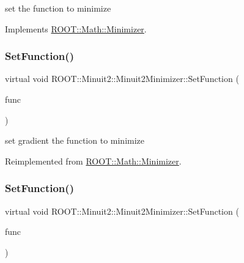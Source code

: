 set the function to minimize 



Implements \mbox{\hyperlink{classROOT_1_1Math_1_1Minimizer_a4391c613ab0c3f9777e56b487ffa5eac}{R\+O\+O\+T\+::\+Math\+::\+Minimizer}}.

\mbox{\label{classROOT_1_1Minuit2_1_1Minuit2Minimizer_aeb98c40cf3486fe8fb9bec4da0f7942e}} 
\subsubsection{\texorpdfstring{SetFunction()}{SetFunction()}\hspace{0.1cm}{\footnotesize\ttfamily [3/4]}}
{\footnotesize\ttfamily virtual void R\+O\+O\+T\+::\+Minuit2\+::\+Minuit2\+Minimizer\+::\+Set\+Function (\begin{DoxyParamCaption}\item[{const \mbox{\hyperlink{namespaceROOT_1_1Math_a014e019aaf9304a00e9231bd9ed232fb}{R\+O\+O\+T\+::\+Math\+::\+I\+Multi\+Grad\+Function}} \&}]{func }\end{DoxyParamCaption})\hspace{0.3cm}{\ttfamily [virtual]}}



set gradient the function to minimize 



Reimplemented from \mbox{\hyperlink{classROOT_1_1Math_1_1Minimizer_a1d9ff15aa732e518a60a05dcbd82c34a}{R\+O\+O\+T\+::\+Math\+::\+Minimizer}}.

\mbox{\label{classROOT_1_1Minuit2_1_1Minuit2Minimizer_aeb98c40cf3486fe8fb9bec4da0f7942e}} 
\subsubsection{\texorpdfstring{SetFunction()}{SetFunction()}\hspace{0.1cm}{\footnotesize\ttfamily [4/4]}}
{\footnotesize\ttfamily virtual void R\+O\+O\+T\+::\+Minuit2\+::\+Minuit2\+Minimizer\+::\+Set\+Function (\begin{DoxyParamCaption}\item[{const \mbox{\hyperlink{namespaceROOT_1_1Math_a014e019aaf9304a00e9231bd9ed232fb}{R\+O\+O\+T\+::\+Math\+::\+I\+Multi\+Grad\+Function}} \&}]{func }\end{DoxyParamCaption})\hspace{0.3cm}{\ttfamily [virtual]}}



